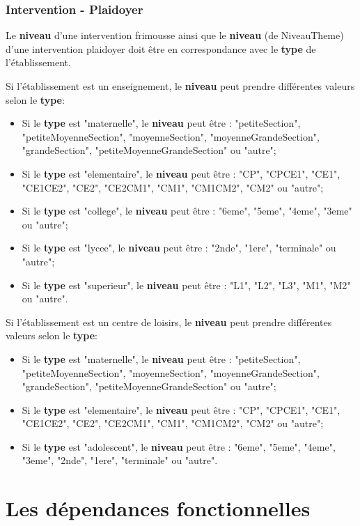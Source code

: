 \documentclass[asi, sansVersion]{picInsa}
\begin{document}
\subsection*{Intervention - Plaidoyer}
Le \textbf{niveau} d'une intervention frimousse ainsi que le \textbf{niveau} (de NiveauTheme) d'une intervention plaidoyer doit être en correspondance avec le \textbf{type} de l'établissement.  

Si l'établissement est un enseignement, le \textbf{niveau} peut prendre différentes valeurs selon le \textbf{type}:
\begin{itemize}
\item Si le \textbf{type} est "maternelle", le \textbf{niveau} peut être : "petiteSection", "petiteMoyenneSection", "moyenneSection", "moyenneGrandeSection", "grandeSection", "petiteMoyenneGrandeSection" ou "autre";
\item Si le \textbf{type} est "elementaire", le \textbf{niveau} peut être : "CP", "CPCE1", "CE1", "CE1CE2", "CE2", "CE2CM1", "CM1", "CM1CM2", "CM2" ou "autre";
\item Si le \textbf{type} est "college", le \textbf{niveau} peut être : "6eme", "5eme", "4eme", "3eme" ou "autre";
\item Si le \textbf{type} est "lycee", le \textbf{niveau} peut être : "2nde", "1ere", "terminale" ou "autre";
\item Si le \textbf{type} est "superieur", le \textbf{niveau} peut être : "L1", "L2", "L3", "M1", "M2" ou "autre".
\end{itemize}

Si l'établissement est un centre de loisirs, le \textbf{niveau} peut prendre différentes valeurs selon le \textbf{type}:
\begin{itemize}
\item Si le \textbf{type} est "maternelle", le \textbf{niveau} peut être : "petiteSection", "petiteMoyenneSection", "moyenneSection", "moyenneGrandeSection", "grandeSection", "petiteMoyenneGrandeSection" ou "autre";
\item Si le \textbf{type} est "elementaire", le \textbf{niveau} peut être : "CP", "CPCE1", "CE1", "CE1CE2", "CE2", "CE2CM1", "CM1", "CM1CM2", "CM2" ou "autre";
\item Si le \textbf{type} est "adolescent", le \textbf{niveau} peut être : "6eme", "5eme", "4eme", "3eme", "2nde", "1ere", "terminale" ou "autre". 
\end{itemize}

\chapter{Les dépendances fonctionnelles}
\end{document}
